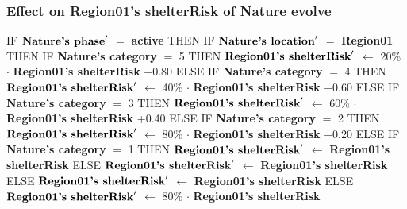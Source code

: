 \documentclass{article}%
\begin{document}
%
\subsubsection{Effect on Region01's shelterRisk of Nature evolve}%
\label{ssubsec:Effect on Region01's shelterRisk of Nature evolve}%
\begin{flushleft}%
IF %
$\mbox{\textbf{Nature's phase}} '$%
$=$%
\textbf{active}%
\linebreak%
\hspace*{2em}%
THEN %
IF %
$\mbox{\textbf{Nature's location}} '$%
$=$%
\textbf{Region01}%
\linebreak%
\hspace*{4em}%
THEN %
IF %
\textbf{Nature's category}%
$=$%
5%
\linebreak%
\hspace*{6em}%
THEN %
$\mbox{\textbf{Region01's shelterRisk}} '$%
$\leftarrow$%
20\%%
$\cdot$%
\textbf{Region01's shelterRisk}%
+0.80%
\linebreak%
\hspace*{6em}%
ELSE %
IF %
\textbf{Nature's category}%
$=$%
4%
\linebreak%
\hspace*{8em}%
THEN %
$\mbox{\textbf{Region01's shelterRisk}} '$%
$\leftarrow$%
40\%%
$\cdot$%
\textbf{Region01's shelterRisk}%
+0.60%
\linebreak%
\hspace*{8em}%
ELSE %
IF %
\textbf{Nature's category}%
$=$%
3%
\linebreak%
\hspace*{10em}%
THEN %
$\mbox{\textbf{Region01's shelterRisk}} '$%
$\leftarrow$%
60\%%
$\cdot$%
\textbf{Region01's shelterRisk}%
+0.40%
\linebreak%
\hspace*{10em}%
ELSE %
IF %
\textbf{Nature's category}%
$=$%
2%
\linebreak%
\hspace*{12em}%
THEN %
$\mbox{\textbf{Region01's shelterRisk}} '$%
$\leftarrow$%
80\%%
$\cdot$%
\textbf{Region01's shelterRisk}%
+0.20%
\linebreak%
\hspace*{12em}%
ELSE %
IF %
\textbf{Nature's category}%
$=$%
1%
\linebreak%
\hspace*{14em}%
THEN %
$\mbox{\textbf{Region01's shelterRisk}} '$%
$\leftarrow$%
\textbf{Region01's shelterRisk}%
\linebreak%
\hspace*{14em}%
ELSE %
$\mbox{\textbf{Region01's shelterRisk}} '$%
$\leftarrow$%
\textbf{Region01's shelterRisk}%
\linebreak%
\hspace*{4em}%
ELSE %
$\mbox{\textbf{Region01's shelterRisk}} '$%
$\leftarrow$%
\textbf{Region01's shelterRisk}%
\linebreak%
\hspace*{2em}%
ELSE %
$\mbox{\textbf{Region01's shelterRisk}} '$%
$\leftarrow$%
80\%%
$\cdot$%
\textbf{Region01's shelterRisk}%
\end{flushleft}
\end{document}
